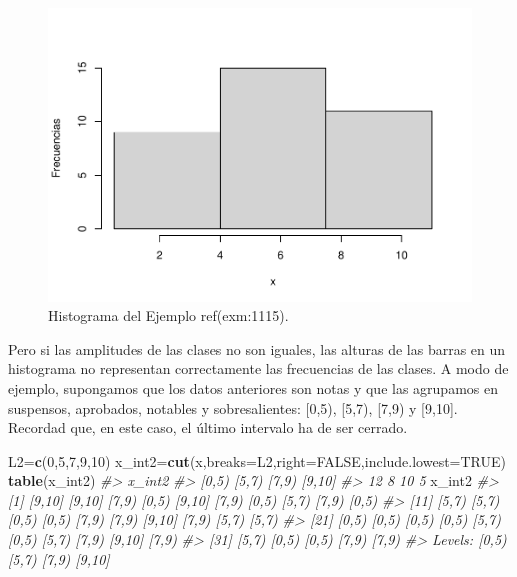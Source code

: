 \documentclass[
]{book}
\newenvironment{Shaded}{\begin{snugshade}}{\end{snugshade}}
\newcommand{\CommentTok}[1]{\textcolor[rgb]{0.56,0.35,0.01}{\textit{#1}}}
\newcommand{\DataTypeTok}[1]{\textcolor[rgb]{0.13,0.29,0.53}{#1}}
\newcommand{\DecValTok}[1]{\textcolor[rgb]{0.00,0.00,0.81}{#1}}
\newcommand{\KeywordTok}[1]{\textcolor[rgb]{0.13,0.29,0.53}{\textbf{#1}}}
\newcommand{\NormalTok}[1]{#1}
\newcommand{\OtherTok}[1]{\textcolor[rgb]{0.56,0.35,0.01}{#1}}
\theoremstyle{definition}
\theoremstyle{definition}
\theoremstyle{definition}
\theoremstyle{remark}
\begin{document}
\begin{figure}

{\centering \includegraphics[width=0.5\linewidth]{13chap13_Agrupados_files/figure-latex/201a-1} 

}

\caption{Histograma del Ejemplo ref(exm:1115).}\label{fig:201a}
\end{figure}

Pero si las amplitudes de las clases no son iguales, las alturas de las barras en un histograma no representan correctamente las frecuencias de las clases. A modo de ejemplo, supongamos que los datos anteriores son notas y que las agrupamos en suspensos, aprobados, notables y sobresalientes: {[}0,5), {[}5,7), {[}7,9) y {[}9,10{]}. Recordad que, en este caso, el último intervalo ha de ser cerrado.

\begin{Shaded}
\begin{Highlighting}[]
\NormalTok{L2=}\KeywordTok{c}\NormalTok{(}\DecValTok{0}\NormalTok{,}\DecValTok{5}\NormalTok{,}\DecValTok{7}\NormalTok{,}\DecValTok{9}\NormalTok{,}\DecValTok{10}\NormalTok{)}
\NormalTok{x\_int2=}\KeywordTok{cut}\NormalTok{(x,}\DataTypeTok{breaks=}\NormalTok{L2,}\DataTypeTok{right=}\OtherTok{FALSE}\NormalTok{,}\DataTypeTok{include.lowest=}\OtherTok{TRUE}\NormalTok{) }
\KeywordTok{table}\NormalTok{(x\_int2)}
\CommentTok{\#\textgreater{} x\_int2}
\CommentTok{\#\textgreater{}  [0,5)  [5,7)  [7,9) [9,10] }
\CommentTok{\#\textgreater{}     12      8     10      5}
\NormalTok{x\_int2}
\CommentTok{\#\textgreater{}  [1] [9,10] [9,10] [7,9)  [0,5)  [9,10] [7,9)  [0,5)  [5,7)  [7,9)  [0,5) }
\CommentTok{\#\textgreater{} [11] [5,7)  [5,7)  [0,5)  [0,5)  [7,9)  [7,9)  [9,10] [7,9)  [5,7)  [5,7) }
\CommentTok{\#\textgreater{} [21] [0,5)  [0,5)  [0,5)  [0,5)  [5,7)  [0,5)  [5,7)  [7,9)  [9,10] [7,9) }
\CommentTok{\#\textgreater{} [31] [5,7)  [0,5)  [0,5)  [7,9)  [7,9) }
\CommentTok{\#\textgreater{} Levels: [0,5) [5,7) [7,9) [9,10]}
\end{Highlighting}
\end{Shaded}
\end{document}
